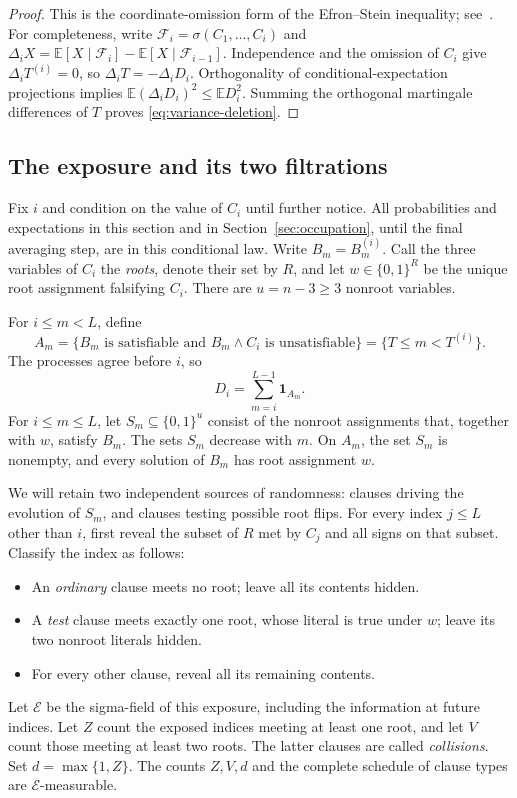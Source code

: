 \documentclass[11pt]{article}
\theoremstyle{remark}
\newcommand{\E}{\mathbb E}
\newcommand{\ind}{\mathbf 1}
\newcommand{\cE}{\mathcal E}
\numberwithin{equation}{section}
\begin{document}
\begin{proof}
This is the coordinate-omission form of the Efron--Stein inequality;
see~\cite[Section~3.2, Equation~(3.6)]{BBLM2005}.
For completeness, write $\mathcal F_i=\sigma(C_1,\ldots,C_i)$ and
$\Delta_i X=\E[X\mid\mathcal F_i]-\E[X\mid\mathcal F_{i-1}]$.
Independence and the omission of $C_i$ give $\Delta_i T^{(i)}=0$,
so $\Delta_i T=-\Delta_i D_i$.
Orthogonality of conditional-expectation projections implies
$\E(\Delta_i D_i)^2\le\E D_i^2$.
Summing the orthogonal martingale differences of $T$ proves
\eqref{eq:variance-deletion}.
\end{proof}

\subsection{The exposure and its two filtrations}
\label{subsec:exposure}

Fix $i$ and condition on the value of $C_i$ until further notice.
All probabilities and expectations in this section and in
Section~\ref{sec:occupation}, until the final averaging step, are in this
conditional law. Write $B_m=B_m^{(i)}$.
Call the three variables of $C_i$ the \emph{roots}, denote their set
by $R$, and let $w\in\{0,1\}^R$ be the unique root assignment falsifying
$C_i$. There are $u=n-3\ge3$ nonroot variables.

For $i\le m<L$, define
\begin{equation}
 A_m=\{B_m\text{ is satisfiable and }B_m\wedge C_i
                      \text{ is unsatisfiable}\}
     =\{T\le m<T^{(i)}\}.
 \label{eq:A}
\end{equation}
The processes agree before $i$, so
\begin{equation}
 D_i=\sum_{m=i}^{L-1}\ind_{A_m}.
 \label{eq:delay}
\end{equation}
For $i\le m\le L$, let $S_m\subseteq\{0,1\}^u$ consist of the
nonroot assignments that, together with $w$, satisfy $B_m$.
The sets $S_m$ decrease with $m$. On $A_m$, the set $S_m$ is nonempty,
and every solution of $B_m$ has root assignment $w$.

We will retain two independent sources of randomness: clauses driving
the evolution of $S_m$, and clauses testing possible root flips.
For every index $j\le L$ other than $i$, first reveal the subset of
$R$ met by $C_j$ and all signs on that subset. Classify the index as
follows:
\begin{itemize}
\item An \emph{ordinary} clause meets no root; leave all its contents hidden.
\item A \emph{test} clause meets exactly one root, whose literal is true
under $w$; leave its two nonroot literals hidden.
\item For every other clause, reveal all its remaining contents.
\end{itemize}
Let $\cE$ be the sigma-field of this exposure, including the information
at future indices. Let $Z$ count the exposed indices meeting at least
one root, and let $V$ count those meeting at least two roots. The latter
clauses are called \emph{collisions}. Set $d=\max\{1,Z\}$.
The counts $Z,V,d$ and the complete schedule of clause types are
$\cE$-measurable.
\end{document}
